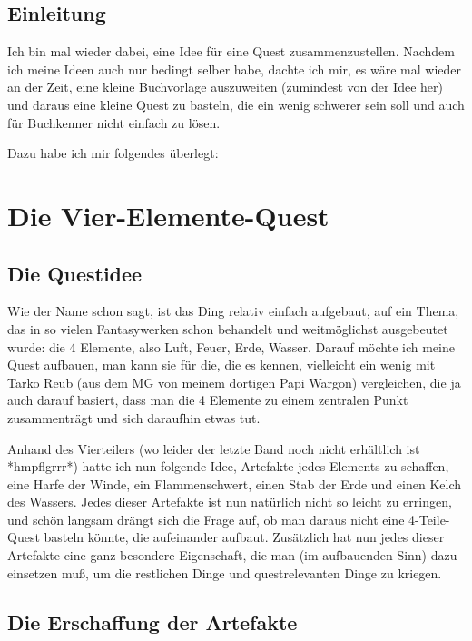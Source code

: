 \documentclass[10pt,a4paper,oneside,onecolumn]{article}
\begin{document}
\subsection{Einleitung}

Ich bin mal wieder dabei, eine Idee für eine Quest zusammenzustellen.
Nachdem ich meine Ideen auch nur bedingt selber habe, dachte ich mir,
es wäre mal wieder an der Zeit, eine kleine Buchvorlage auszuweiten
(zumindest von der Idee her) und daraus eine kleine Quest zu basteln,
die ein wenig schwerer sein soll und auch für Buchkenner nicht einfach
zu lösen.

Dazu habe ich mir folgendes überlegt:


\section{Die Vier-Elemente-Quest}


\subsection{Die Questidee}

Wie der Name schon sagt, ist das Ding relativ einfach aufgebaut, auf
ein Thema, das in so vielen Fantasywerken schon behandelt und weitmöglichst
ausgebeutet wurde: die 4 Elemente, also Luft, Feuer, Erde, Wasser.
Darauf möchte ich meine Quest aufbauen, man kann sie für die, die
es kennen, vielleicht ein wenig mit Tarko Reub (aus dem MG von meinem
dortigen Papi Wargon) vergleichen, die ja auch darauf basiert, dass
man die 4 Elemente zu einem zentralen Punkt zusammenträgt und sich
daraufhin etwas tut.

Anhand des Vierteilers (wo leider der letzte Band noch nicht erhältlich
ist *hmpflgrrr*) hatte ich nun folgende Idee, Artefakte jedes Elements
zu schaffen, eine Harfe der Winde, ein Flammenschwert, einen Stab
der Erde und einen Kelch des Wassers. Jedes dieser Artefakte ist nun
natürlich nicht so leicht zu erringen, und schön langsam drängt sich
die Frage auf, ob man daraus nicht eine 4-Teile-Quest basteln könnte,
die aufeinander aufbaut. Zusätzlich hat nun jedes dieser Artefakte
eine ganz besondere Eigenschaft, die man (im aufbauenden Sinn) dazu
einsetzen muß, um die restlichen Dinge und questrelevanten Dinge zu
kriegen.


\subsection{Die Erschaffung der Artefakte}
\end{document}

